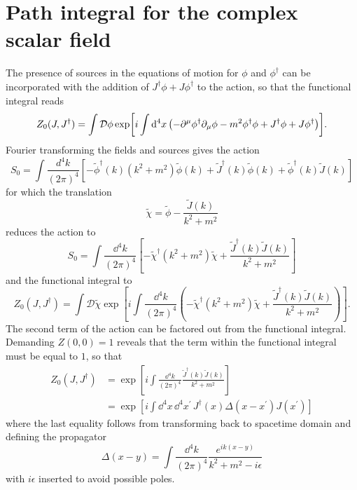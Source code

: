 \section{Path integral for the complex scalar field}
The presence of sources in the equations of motion for $\phi$ and $\phi^\dagger$ can be incorporated with the addition of $J^\dagger\phi+J\phi^\dagger$ to the action, so that the functional integral reads
\begin{equation}
    Z_0(J,J^\dagger)=\int\mathcal{D}\phi\exp[i\int\dd^4 x\,\qty(-\partial^\mu\phi^\dagger\partial_\mu\phi-m^2\phi^\dagger\phi+J^\dagger\phi+J\phi^\dagger)].
\end{equation}
Fourier transforming the fields and sources gives the action
\begin{equation}
S_{0}=\int \frac{d^{4} k}{(2 \pi)^{4}}\left[-\widetilde{\phi}^{\dagger}(k)\left(k^{2}+m^{2}\right) \widetilde{\phi}(k)+\widetilde{J}^{\dagger}(k) \widetilde{\phi}(k)+\widetilde{\phi}^{\dagger}(k) \widetilde{J}(k)\right]
\end{equation}
for which the translation 
\begin{equation}
\widetilde{\chi}=\widetilde{\phi}-\frac{\widetilde{J}(k)}{k^{2}+m^{2}}
\end{equation}
reduces the action to
\begin{equation}
S_{0}=\int \frac{\dd^{4} k}{(2 \pi)^{4}}\left[-\widetilde{\chi}^{\dagger}\left(k^{2}+m^{2}\right) \widetilde{\chi}+\frac{\widetilde{J}^{\dagger}(k) \widetilde{J}(k)}{k^{2}+m^{2}}\right]
\end{equation}
and the functional integral to
\begin{equation}
Z_{0}(J,J^\dagger)=\int \mathcal{D} \widetilde{\chi} \exp[i\int \frac{\dd^{4} k}{(2 \pi)^{4}}\left(-\widetilde{\chi}^{\dagger}\left(k^{2}+m^{2}\right) \widetilde{\chi}+\frac{\widetilde{J}^{\dagger}(k) \widetilde{J}(k)}{k^{2}+m^{2}}\right)].
\end{equation}
The second term of the action can be factored out from the functional integral. Demanding $Z(0,0)=1$ reveals that the term within the functional integral must be equal to $1$, so that
\begin{equation}
\begin{aligned}
Z_{0}(J,J^\dagger)&=\exp[i \int \frac{\dd^{4} k}{(2 \pi)^{4}}\frac{\widetilde{J}^{\dagger}(k) \widetilde{J}(k)}{k^{2}+m^{2}}]\\
&=\exp[i\int \dd^{4} x \,\dd^{4} x^{\prime}\, J^{\dagger}(x) \Delta\left(x-x^{\prime}\right) J\left(x^{\prime}\right)]
\end{aligned}
\end{equation}
where the last equality follows from transforming back to spacetime domain and defining the propagator
 \begin{equation}
    \Delta(x-y)=\int\frac{\dd^4k}{(2\pi)^4}\frac{e^{ik(x-y)}}{k^2+m^2-i\epsilon}
\end{equation}
with $i\epsilon$ inserted to avoid possible poles.\\

